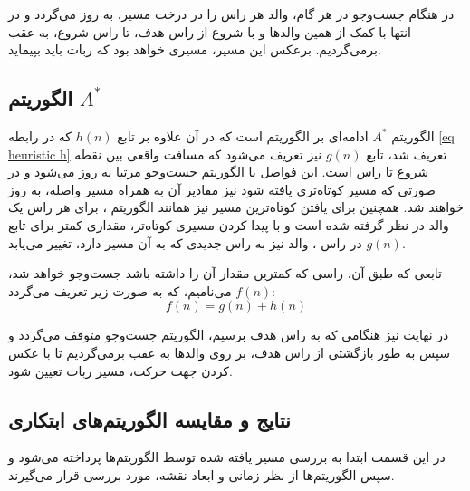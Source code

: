 در هنگام جست‌وجو در هر گام، والد هر راس را در درخت مسیر، به روز می‌گردد و در انتها با کمک از همین والد‌ها و با شروع از راس هدف، تا راس شروع، به عقب برمی‌گردیم. برعکس این مسیر، مسیری خواهد بود که ربات باید بپیماید.

\subsection{الگوریتم $A^*$}
الگوریتم $A^*$ ادامه‌ای بر الگوریتم  است که در آن علاوه بر تابع $h(n)$ که در رابطه \ref{eq heuristic h} تعریف شد، تابع $g(n)$ نیز تعریف می‌شود که مسافت واقعی بین نقطه شروع تا راس  است. این فواصل با الگوریتم جست‌وجو مرتبا به روز می‌شود و در صورتی که مسیر کوتاه‌تری یافته شود نیز مقادیر آن به همراه مسیر واصله، به روز خواهند شد. همچنین برای یافتن کوتاه‌ترین مسیر نیز همانند الگوریتم ، برای هر راس یک والد در نظر گرفته شده است و با پیدا کردن مسیری کوتاه‌تر، مقداری کمتر برای تابع $g(n)$ در راس ، والد نیز به راس جدیدی که به آن مسیر دارد، تغییر می‌یابد.

تابعی که طبق آن، راسی که کمترین مقدار آن را داشته باشد جست‌وجو خواهد شد، $f(n)$ می‌نامیم، که به صورت زیر تعریف می‌گردد:
\begin{equation}%
	f(n) = g(n) + h(n)
\end{equation}

در نهایت نیز هنگامی که به راس هدف برسیم، الگوریتم جست‌وجو متوقف می‌گردد و سپس به طور بازگشتی از راس هدف، بر روی والدها به عقب برمی‌گردیم تا با عکس کردن جهت حرکت، مسیر ربات تعیین شود. 


\subsection{نتایج و مقایسه الگوریتم‌های ابتکاری}\label{sec heuristic result}
در این قسمت ابتدا به بررسی مسیر یافته شده توسط الگوریتم‌ها پرداخته می‌شود و سپس الگوریتم‌ها از نظر زمانی و ابعاد نقشه، مورد بررسی قرار می‌گیرند.

